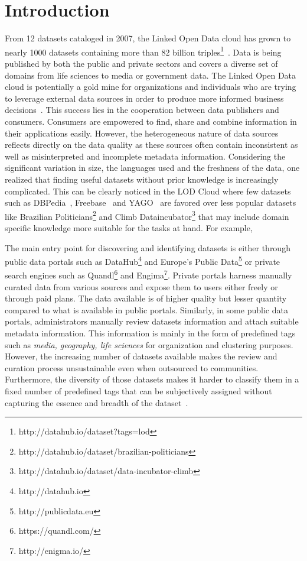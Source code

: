 \documentclass[runningheads,a4paper]{llncs}
\begin{document}
\section{Introduction}
\label{sec:introduction}
From 12 datasets cataloged in 2007, the Linked Open Data cloud has grown to nearly 1000 datasets containing more than 82 billion triples\footnote{http://datahub.io/dataset?tags=lod}~\cite{BizerHeath2009}. Data is being published by both the public and private sectors and covers a diverse set of domains from life sciences to media or government data. The Linked Open Data cloud is potentially a gold mine for organizations and individuals who are trying to leverage external data sources in order to produce more informed business decisions~\cite{Boyd2011}. This success lies in the cooperation between data publishers and consumers. Consumers are empowered to find, share and combine information in their applications easily. However, the heterogeneous nature of data sources reflects directly on the data quality as these sources often contain inconsistent as well as misinterpreted and incomplete metadata information. Considering the significant variation in size, the languages used and the freshness of the data, one realized that finding useful datasets without prior knowledge is increasingly complicated. This can be clearly noticed in the LOD Cloud where few datasets such as DBPedia~\cite{Bizer:2009:DCP:1640541.1640848}, Freebase~\cite{Bollacker:2008:FCC:1376616.1376746} and YAGO~\cite{Suchanek:2007:YCS:1242572.1242667} are favored over less popular datasets like Brazilian Politicians\footnote{http://datahub.io/dataset/brazilian-politicians} and Climb Dataincubator\footnote{http://datahub.io/dataset/data-incubator-climb} that may include domain specific knowledge more suitable for the tasks at hand. For example,

The main entry point for discovering and identifying datasets is either through public data portals such as DataHub\footnote{http://datahub.io} and Europe's Public Data\footnote{http://publicdata.eu} or private search engines such as Quandl\footnote{https://quandl.com/} and Engima\footnote{http://enigma.io/}. Private portals harness manually curated data from various sources and expose them to users either freely or through paid plans. The data available is of higher quality but lesser quantity compared to what is available in public portals. Similarly, in some public data portals, administrators manually review datasets information and attach suitable metadata information. This information is mainly in the form of predefined tags such as \textit{media, geography, life sciences} for organization and clustering purposes. However, the increasing number of datasets available makes the review and curation process unsustainable even when outsourced to communities. Furthermore, the diversity of those datasets makes it harder to classify them in a fixed number of predefined tags that can be subjectively assigned without capturing the essence and breadth of the dataset~\cite{6690016}.
\end{document}
